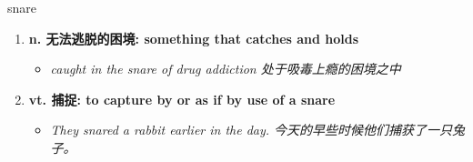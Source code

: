 
\begin{frame}
{\huge snare}
\begin{center}
\begin{enumerate}\Large
  \item \textbf{n. 无法逃脱的困境: something that catches and holds}
  \begin{itemize}
    \item \em{\Large{caught in the snare of drug addiction 处于吸毒上瘾的困境之中}}
  \end{itemize}
  \item \textbf{vt. 捕捉: to capture by or as if by use of a snare}
  \begin{itemize}
    \item \em{\Large{They snared a rabbit earlier in the day. 今天的早些时候他们捕获了一只兔子。}}
  \end{itemize}
\end{enumerate}
\end{center}
\end{frame}
